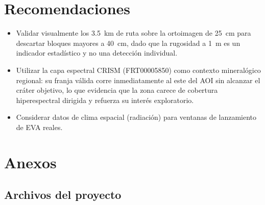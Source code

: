 \documentclass{article}
\begin{document}
\section*{Recomendaciones}

\begin{itemize}
    \item Validar visualmente los 3.5~km de ruta sobre la ortoimagen de 25~cm para descartar bloques mayores a 40~cm, dado que la rugosidad a 1~m es un indicador estadístico y no una detección individual.
    \item Utilizar la capa espectral CRISM (FRT00005850) como contexto mineralógico regional: su franja válida corre inmediatamente al este del AOI sin alcanzar el cráter objetivo, lo que evidencia que la zona carece de cobertura hiperespectral dirigida y refuerza su interés exploratorio.
    \item Considerar datos de clima espacial (radiación) para ventanas de lanzamiento de EVA reales.
\end{itemize}

\newpage

\appendix
\section{Anexos}

\subsection{Archivos del proyecto}
\end{document}
